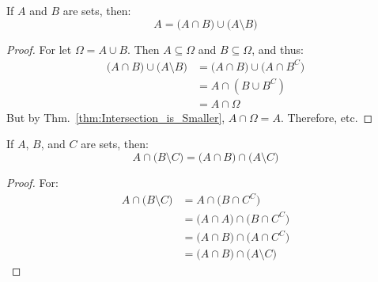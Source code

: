        \begin{theorem}
            If $A$ and $B$ are sets, then:
            \begin{equation}
                A=\big(A\cap{B}\big)
                    \cup\big(A\setminus{B}\big)
            \end{equation}
        \end{theorem}
        \begin{proof}
            For let $\Omega=A\cup{B}$. Then
            $A\subseteq\Omega$ and $B\subseteq\Omega$,
            and thus:
            \begin{subequations}
                \begin{align}
                    \big(A\cap{B})\cup\big(A\setminus{B}\big)
                    &=\big(A\cap{B}\big)
                        \cup\big(A\cap{B}^{C}\big)\\
                    &=A\cap(B\cup{B}^{C})\\
                    &=A\cap\Omega
                \end{align}
            \end{subequations}
            But by Thm.~\ref{thm:Intersection_is_Smaller},
            $A\cap\Omega=A$. Therefore, etc.
        \end{proof}
        \begin{theorem}
            If $A$, $B$, and $C$ are sets, then:
            \begin{equation}
                A\cap\big(B\setminus{C}\big)
                =\big(A\cap{B}\big)\cap\big(A\setminus{C}\big)
            \end{equation}
        \end{theorem}
        \begin{proof}
            For:
            \begin{subequations}
                \begin{align}
                    A\cap\big(B\setminus{C}\big)
                    &=A\cap\big(B\cap{C}^{C}\big)\\
                    &=\big(A\cap{A}\big)
                        \cap\big(B\cap{C}^{C}\big)\\
                    &=\big(A\cap{B}\big)
                        \cap\big(A\cap{C}^{C}\big)\\
                    &=\big(A\cap{B}\big)
                        \cap\big(A\setminus{C}\big)
                \end{align}
            \end{subequations}
        \end{proof}
